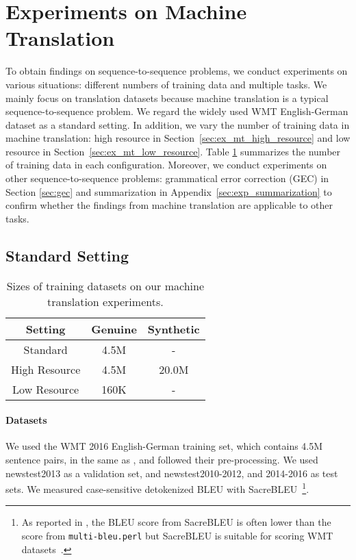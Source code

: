 \documentclass[11pt]{article}
\begin{document}
\section{Experiments on Machine Translation}
To obtain findings on sequence-to-sequence problems, we conduct experiments on various situations: different numbers of training data and multiple tasks.
We mainly focus on translation datasets because machine translation is a typical sequence-to-sequence problem.
We regard the widely used WMT English-German dataset as a standard setting.
In addition, we vary the number of training data in machine translation: high resource in Section~\ref{sec:ex_mt_high_resource} and low resource in Section~\ref{sec:ex_mt_low_resource}.
Table \ref{table:mt_dataset} summarizes the number of training data in each configuration.
Moreover, we conduct experiments on other sequence-to-sequence problems: grammatical error correction (GEC) in Section \ref{sec:gec} and summarization in Appendix~\ref{sec:exp_summarization} to confirm whether the findings from machine translation are applicable to other tasks.


\subsection{Standard Setting}
\label{sec:exp_standard_mt}

\begin{table}[!t]
  \centering
\begin{tabular}{ c | c | c } \hline
  Setting & Genuine & Synthetic \\ \hline
  Standard & 4.5M & - \\
  High Resource & 4.5M & 20.0M \\
  Low Resource & 160K & - \\ \hline
  \end{tabular}
  \caption{Sizes of training datasets on our machine translation experiments.}
  \label{table:mt_dataset}
\end{table}
\paragraph{Datasets}
We used the WMT 2016 English-German training set, which contains 4.5M sentence pairs, in the same as , and followed their pre-processing.
We used newstest2013 as a validation set, and newstest2010-2012, and 2014-2016 as test sets.
We measured case-sensitive detokenized BLEU with SacreBLEU~\cite{post-2018-call}\footnote{As reported in , the BLEU score from SacreBLEU is often lower than the score from \texttt{multi-bleu.perl} but SacreBLEU is suitable for scoring WMT datasets~\cite{post-2018-call}.}.
\end{document}
